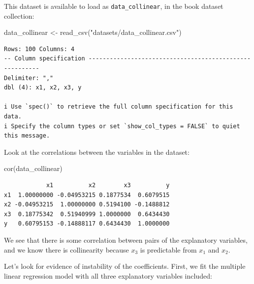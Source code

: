 \documentclass[
  letterpaper,
  8pt,
  a4paper]{book}
\newenvironment{Shaded}{\begin{snugshade}}{\end{snugshade}}
\newcommand{\AttributeTok}[1]{\textcolor[rgb]{0.40,0.45,0.13}{#1}}
\newcommand{\FunctionTok}[1]{\textcolor[rgb]{0.28,0.35,0.67}{#1}}
\newcommand{\NormalTok}[1]{\textcolor[rgb]{0.00,0.23,0.31}{#1}}
\newcommand{\OtherTok}[1]{\textcolor[rgb]{0.00,0.23,0.31}{#1}}
\newcommand{\SpecialCharTok}[1]{\textcolor[rgb]{0.37,0.37,0.37}{#1}}
\newcommand{\StringTok}[1]{\textcolor[rgb]{0.13,0.47,0.30}{#1}}
\begin{document}
This dataset is available to load as \texttt{data\_collinear}, in the
book dataset collection:

\begin{Shaded}
\begin{Highlighting}[]
\NormalTok{data\_collinear }\OtherTok{\textless{}{-}} \FunctionTok{read\_csv}\NormalTok{(}\StringTok{"datasets/data\_collinear.csv"}\NormalTok{)}
\end{Highlighting}
\end{Shaded}

\begin{verbatim}
Rows: 100 Columns: 4
-- Column specification --------------------------------------------------------
Delimiter: ","
dbl (4): x1, x2, x3, y

i Use `spec()` to retrieve the full column specification for this data.
i Specify the column types or set `show_col_types = FALSE` to quiet this message.
\end{verbatim}

Look at the correlations between the variables in the dataset:

\begin{Shaded}
\begin{Highlighting}[]
\FunctionTok{cor}\NormalTok{(data\_collinear)}
\end{Highlighting}
\end{Shaded}

\begin{verbatim}
            x1          x2        x3          y
x1  1.00000000 -0.04953215 0.1877534  0.6079515
x2 -0.04953215  1.00000000 0.5194100 -0.1488812
x3  0.18775342  0.51940999 1.0000000  0.6434430
y   0.60795153 -0.14888117 0.6434430  1.0000000
\end{verbatim}

We see that there is some correlation between pairs of the explanatory
variables, and we know there is collinearity because \(x_3\) is
predictable from \(x_1\) and \(x_2\).

Let's look for evidence of instability of the coefficients. First, we
fit the multiple linear regression model with all three explanatory
variables included:

\begin{Shaded}
\end{Shaded}
\end{document}
